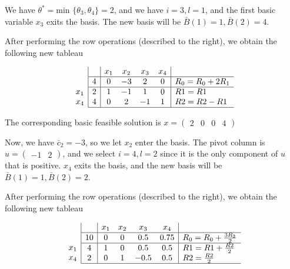 \documentclass[11pt,a4paper]{article}
\begin{document}
We have $\theta^*=\text{min }\{\theta_3, \theta_4\}=2$, and we have $i=3, l=1$, and the first basic variable $x_3$ exits the basis. The new basis will be $\bar{B}(1)=1, \bar{B}(2)=4$.

After performing the row operations (described to the right), we obtain the following new tableau

$$
\begin{array}{c}
\\
 \\
x_1 \\
x_4 \\ 
\end{array}
\begin{array}{|c|cccc|l}
    & x_1 & x_2 & x_3 & x_4 & \\ \hline
  4 & 0 & -3 & 2 & 0 & R_0=R_0+2R_1 \\  \hline
  2 & 1 & -1 & 1 & 0 & R1=R1\\
  4 & 0 & 2 & -1 & 1 & R2 = R2 - R1\\\hline
\end{array}
$$

The corresponding basic feasible solution is $x=\begin{pmatrix}2 & 0 & 0 & 4\end{pmatrix}$

Now, we have $\bar{c}_2=-3$, so we let $x_2$ enter the basis. The pivot column is $u=\begin{pmatrix}-1 & 2\end{pmatrix}$, and we select $i=4,l=2$ since it is the only component of $u$ that is positive. $x_4$ exits the basis, and the new basis will be $\bar{B}(1)=1, \bar{B}(2)=2$.

After performing the row operations (described to the right), we obtain the following new tableau

$$
\begin{array}{c}
\\
 \\
x_1 \\
x_4 \\ 
\end{array}
\begin{array}{|c|cccc|l}
    & x_1 & x_2 & x_3 & x_4 & \\ \hline
  10& 0 & 0 & 0.5 & 0.75 & R_0=R_0+\frac{3R_2}{2} \\  \hline
  4 & 1 & 0 & 0.5 & 0.5 & R1=R1+\frac{R2}{2}\\
  2 & 0 & 1 & -0.5 & 0.5 & R2 = \frac{R2}{2}\\\hline
\end{array}
$$
\end{document}
